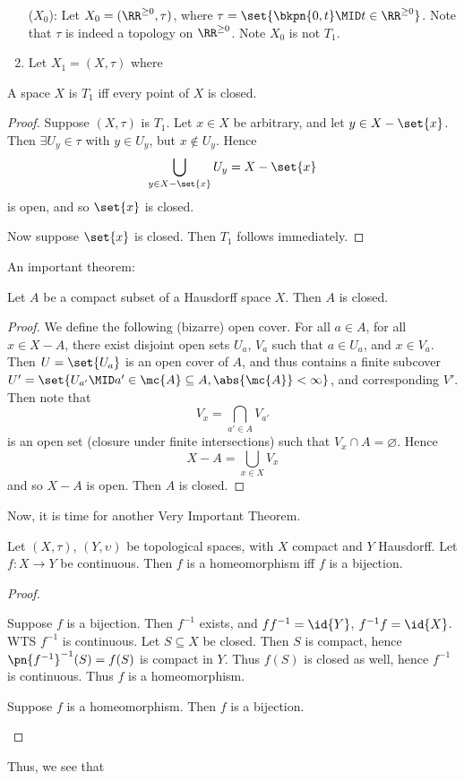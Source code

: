 \documentclass{fkbook}
\begin{document}
\begin{adjustwidth}{1em}{1em}
\begin{enumerate}[label=($X_\arabic*)$:]
    \item[($X_0$):] Let $X_0 = (\RR^{\geq 0}, \tau)$, where $\tau =
      \set{\bkpn{0,t} \MID t \in \RR^{\geq 0}}$. Note that $\tau$ is
      indeed a topology on $\RR^{\geq 0}$. Note $X_0$ is not $T_1$.
    \item Let $X_1 = (X, \tau)$ where
  \end{enumerate}
  \begin{theorem}
    A space $X$ is $T_1$ iff every point of $X$ is closed.
  \end{theorem}
  \begin{proof}
    Suppose $(X, \tau)$ is $T_1$. Let $x \in X$ be arbitrary, and let
    $y \in X- \set{x}$. Then $\exists U_y \in \tau$ with $y \in U_y$,
    but $x \not \in U_y$. Hence
    \[
      \bigcup_{y \in X - \set{x}} U_y = X - \set{x}
    \]
    is open, and so $\set{x}$ is closed.

    Now suppose $\set{x}$ is closed. Then $T_1$ follows immediately.
  \end{proof}
  An important theorem:
  \begin{theorem}
    Let $A$ be a compact subset of a Hausdorff space $X$. Then $A$ is
    closed.
  \end{theorem}
  \begin{proof}
    We define the following (bizarre) open cover. For all $a \in A$,
    for all $x \in X - A$, there exist disjoint open sets $U_a$, $V_a$
    such that $a \in U_a$, and $x \in V_a$. Then $U = \set{U_a}$ is an
    open cover of $A$, and thus contains a finite subcover $U' =
    \set{U_{a'} \MID a' \in \mc{A} \subseteq A, \abs{\mc{A}} <
      \infty}$, and corresponding $V'$. Then note that
    \[
      V_x = \bigcap_{a' \in A} V_{a'}
    \]
    is an open set (closure under finite intersections) such that $V_x
    \cap A = \varnothing$. Hence
    \[
      X - A = \bigcup_{x \in X} V_x
    \]
    and so $X - A$ is open. Then $A$ is closed.
  \end{proof}
  Now, it is time for another Very Important Theorem\texttrademark.
  \begin{theorem}
    Let $(X, \tau)$, $(Y, \upsilon)$ be topological spaces, with $X$
    compact and $Y$ Hausdorff. Let $f : X \to Y$ be continuous. Then
    $f$ is a homeomorphism iff $f$ is a bijection.
  \end{theorem}
  \begin{proof}~
    \begin{iffproof}
      \item Suppose $f$ is a bijection. Then $f^{-1}$ exists, and
        $ff^{-1} = \id{Y}$, $f^{-1}f = \id{X}$. WTS $f^{-1}$ is
        continuous. Let $S \subseteq X$ be closed. Then $S$ is
        compact, hence $\pn{f^{-1}}^{-1}(S) = f(S)$ is compact in $Y$.
        Thus $f(S)$ is closed as well, hence $f^{-1}$ is continuous.
        Thus $f$ is a homeomorphism.
      \item Suppose $f$ is a homeomorphism. Then $f$ is a bijection.
    \end{iffproof}
  \end{proof}
  Thus, we see that
\end{adjustwidth}
\end{document}
